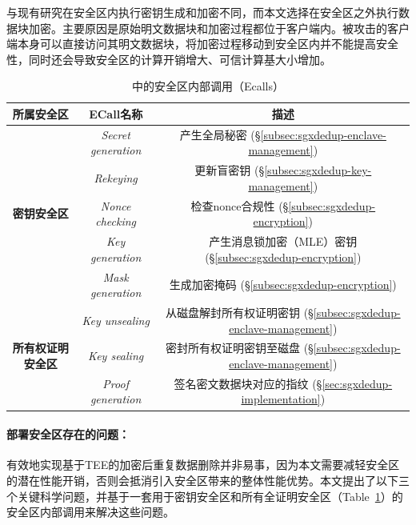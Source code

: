 与现有研究\cite{kim2019ShieldStore,fuhry20,djoko2019NEXUS}在安全区内执行密钥生成和加密不同，而本文选择在安全区之外执行数据块加密。主要原因是原始明文数据块和加密过程都位于客户端内。被攻击的客户端本身可以直接访问其明文数据块，将加密过程移动到安全区内并不能提高安全性，同时还会导致安全区的计算开销增大、可信计算基大小增加。

\begin{table}[!htb]
  \small
  \centering
  \begin{tabular}{ccc}
  \toprule
  {\bf 所属安全区} & {\bf ECall名称} & {\bf 描述}\\ 
  \midrule
  \multirow{5}{*}{\bf 密钥安全区}
  & \textit{ Secret generation} & 产生全局秘密 
  (\S\ref{subsec:sgxdedup-enclave-management}) \\
  & \textit{ Rekeying} & 更新盲密钥 
  (\S\ref{subsec:sgxdedup-key-management}) \\
  & \textit{ Nonce checking} & 检查nonce合规性 
  (\S\ref{subsec:sgxdedup-encryption}) \\
  & \textit{ Key generation} & 产生消息锁加密（MLE）密钥 (\S\ref{subsec:sgxdedup-encryption}) \\
  & \textit{ Mask generation} & 生成加密掩码 (\S\ref{subsec:sgxdedup-encryption}) \\
  \hline
  \multirow{3}{*}{\bf 所有权证明安全区}
  & \textit{ Key unsealing} & 从磁盘解封所有权证明密钥 (\S\ref{subsec:sgxdedup-enclave-management}) \\
  & \textit{ Key sealing} & 密封所有权证明密钥至磁盘 (\S\ref{subsec:sgxdedup-enclave-management}) \\
  & \textit{ Proof generation} & 签名密文数据块对应的指纹 
  (\S\ref{sec:sgxdedup-implementation}) \\
  \bottomrule
  \end{tabular}
  \caption{\sysnameS 中的安全区内部调用（Ecalls）}
  \label{tab:sgxdedup-ecall}
\end{table}

\paragraph*{部署安全区存在的问题：}有效地​​实现基于TEE的加密后重复数据删除并非易事，因为本文需要减轻安全区的潜在性能开销，否则会抵消引入安全区带来的整体性能优势。本文提出了以下三个关键科学问题，并基于一套用于密钥安全区和所有全证明安全区（Table~\ref{tab:sgxdedup-ecall}）的安全区内部调用来解决这些问题。

